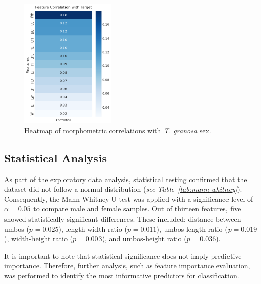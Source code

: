 \vspace{0.5cm}
\begin{figure}[!htbp]
	\centering
	\includegraphics[width=0.4\textwidth]{figures/heatmap.png}
	\caption{Heatmap of morphometric correlations with \textit{T. granosa} sex.}
	\label{fig:heatmap}
\end{figure}

\newpage
\subsection{Statistical Analysis}

As part of the exploratory data analysis, statistical testing confirmed that the dataset did not follow a normal distribution (\textit{see Table~\ref{tab:mann-whitney}}). Consequently, the Mann-Whitney U test was applied with a significance level of $\alpha = 0.05$ to compare male and female samples. Out of thirteen features, five showed statistically significant differences. These included: distance between umbos ($p = 0.025$), length-width ratio ($p = 0.011$), umbos-length ratio ($p = 0.019$), width-height ratio ($p = 0.003$), and umbos-height ratio ($p = 0.036$). 

It is important to note that statistical significance does not imply predictive importance. Therefore, further analysis, such as feature importance evaluation, was performed to identify the most informative predictors for classification.

